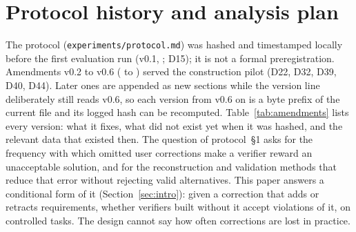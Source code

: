 \section{Protocol history and analysis plan}
\label{app:protocol}\label{sec:protocol}\label{sec:amendments}
The protocol (\texttt{experiments/protocol.md}) was hashed and timestamped locally before the first evaluation run
(v0.1, ; D15); it is not a formal preregistration. Amendments v0.2 to v0.6
( to ) served the construction pilot (D22, D32, D39, D40, D44). Later
ones are appended as new sections while the version line deliberately still reads v0.6, so each version from v0.6 on
is a byte prefix of the current file and its logged hash can be recomputed. Table~\ref{tab:amendments} lists every
version: what it fixes, what did not exist yet when it was hashed, and the relevant data that existed then. The
question of protocol~\S1 asks for the frequency with which omitted user corrections make a verifier reward an
unacceptable solution, and for the reconstruction and validation methods that reduce that error without rejecting valid
alternatives. This paper answers a conditional form of it (Section~\ref{sec:intro}): given a correction that adds or
retracts requirements, whether verifiers built without it accept violations of it, on controlled tasks. The design
cannot say how often corrections are lost in practice.


